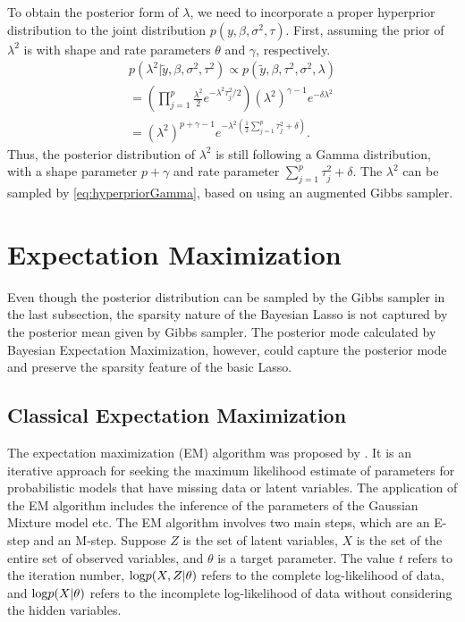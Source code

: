 To obtain the posterior form of $\lambda$, we need to incorporate a proper hyperprior distribution to the joint distribution $p(y,\beta,\sigma^2,\tau)$. First, assuming the prior of $\lambda^2$ is with shape and rate parameters $\theta$ and $\gamma$, respectively.
\begin{equation}
	\label{eq:hyperpriorGamma}
	\begin{multlined}
		p(\lambda^2|\tilde{y},\beta,\sigma^2,\tau^2) \propto  	p(\tilde{y},\beta,\tau^2,\sigma^2,\lambda)  \\
		= \left(\prod_{j=1}^p \frac{\lambda^2}{2} e^{-\lambda^2\tau_j^2/2} \right)(\lambda^2)^{\gamma-1}e^{-\delta\lambda^2}\\
		= (\lambda^2)^{p+\gamma-1}e^{-\lambda^2(\frac{1}{2}\sum_{j=1}^p \tau_j^2+\delta)}.
	\end{multlined}
\end{equation} 
Thus, the posterior distribution of $\lambda^2$ is still following a Gamma distribution, with a shape parameter $p+\gamma$ and rate parameter $\sum_{j=1}^p \tau_j^2+\delta$. The $\lambda^2$ can be sampled by \autoref{eq:hyperpriorGamma}, based on using an augmented Gibbs sampler.
\section{Expectation Maximization}
Even though the posterior distribution can be sampled by the Gibbs sampler in the last subsection, the sparsity nature of the Bayesian Lasso is not captured by the posterior mean given by Gibbs sampler. The posterior mode calculated by Bayesian Expectation Maximization, however, could capture the posterior mode and preserve the sparsity feature of the basic Lasso.
\subsection{Classical Expectation Maximization}
The expectation maximization (EM) algorithm was proposed by \cite{EM}. It is an iterative approach for seeking the maximum likelihood estimate of parameters for probabilistic models that have missing data or latent variables.
The application of the EM algorithm includes the inference of the parameters of the Gaussian Mixture model etc. The EM algorithm involves two main steps, which are an E-step and an M-step.
Suppose $Z$ is the set of latent variables, $X$ is the set of the entire set of observed variables, and $\theta$ is a target parameter. The value $t$ refers to the iteration number, $\textnormal{log} p(X, Z|\theta)$ refers to the complete log-likelihood of data, and $\textnormal{log} p(X|\theta)$ refers to the incomplete log-likelihood of data without considering the hidden variables.

